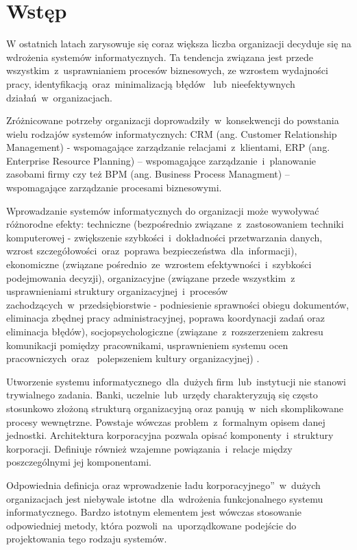 \chapter{Wstęp}
W ostatnich latach zarysowuje się coraz większa liczba organizacji decyduje się na wdrożenia systemów informatycznych. Ta tendencja związana jest przede wszystkim~z~usprawnianiem procesów biznesowych, ze wzrostem wydajności pracy, identyfikacją~oraz~minimalizacją błędów ~lub~nieefektywnych działań~w~organizacjach.

Zróżnicowane potrzeby organizacji doprowadziły~w~konsekwencji do powstania wielu rodzajów systemów informatycznych: CRM (ang. Customer Relationship Management) - wspomagające zarządzanie relacjami~z~klientami, ERP (ang. Enterprise Resource Planning) – wspomagające zarządzanie~i~planowanie zasobami firmy czy też BPM (ang. Business Process Managment) – wspomagające zarządzanie procesami biznesowymi. 

Wprowadzanie systemów informatycznych do organizacji może wywoływać różnorodne efekty: techniczne (bezpośrednio związane~z~zastosowaniem techniki komputerowej - zwiększenie szybkości~i~dokładności przetwarzania danych, wzrost szczegółowości~oraz~poprawa bezpieczeństwa~dla~informacji), ekonomiczne (związane pośrednio~ze~wzrostem efektywności~i~szybkości podejmowania decyzji), organizacyjne (związane przede wszystkim~z~ usprawnieniami struktury organizacyjnej~i~procesów zachodzących~w~przedsiębiorstwie - podniesienie sprawności obiegu dokumentów, eliminacja zbędnej pracy administracyjnej, poprawa koordynacji zadań oraz eliminacja błędów), socjopsychologiczne (związane~z~rozszerzeniem zakresu komunikacji pomiędzy pracownikami, usprawnieniem systemu ocen pracowniczych~oraz~ polepszeniem kultury organizacyjnej) \cite{EfektyZasSys}.

Utworzenie systemu informatycznego~dla~dużych firm~lub~instytucji nie stanowi trywialnego zadania. Banki, uczelnie~lub~urzędy charakteryzują się często stosunkowo złożoną strukturą organizacyjną oraz panują~w~nich skomplikowane procesy wewnętrzne. Powstaje wówczas problem~z~formalnym opisem danej jednostki. Architektura korporacyjna pozwala opisać komponenty~i~struktury korporacji. Definiuje również wzajemne powiązania~i~relacje między poszczególnymi jej komponentami. 
 
Odpowiednia definicja oraz wprowadzenie \quotedblbase ładu korporacyjnego\textquotedblright~w~dużych organizacjach jest niebywale istotne~dla~wdrożenia funkcjonalnego systemu informatycznego. Bardzo istotnym elementem jest wówczas stosowanie odpowiedniej metody, która pozwoli~na~uporządkowane podejście do projektowania tego rodzaju systemów.

